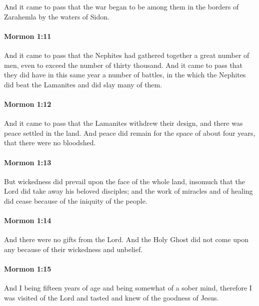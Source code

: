 			And it came to pass that the war began to be among them
			in the borders of Zarahemla by the waters of Sidon.

		\paragraph{Mormon 1:11} %
			\label{MORMON-1-11}

			And it came to pass that the Nephites had gathered together a great number of men,
			even to exceed the number of thirty thousand.
			And it came to pass that they did have in this same year a number of battles,
			in the which the Nephites did beat the Lamanites and did slay many of them.

		\paragraph{Mormon 1:12} %
			\label{MORMON-1-12}

			And it came to pass that the Lamanites withdrew their design,
			and there was peace settled in the land.
			And peace did remain for the space of about four years,
			that there were no bloodshed.

		\paragraph{Mormon 1:13} %
			\label{MORMON-1-13}

			But wickedness did prevail upon the face of the whole land,
			insomuch that the Lord did take away his beloved disciples;
			and the work of miracles and of healing did cease
			because of the iniquity of the people.

		\paragraph{Mormon 1:14} %
			\label{MORMON-1-14}

			And there were no gifts from the Lord.
			And the Holy Ghost did not come upon any
			because of their wickedness and unbelief.

		\paragraph{Mormon 1:15} %
			\label{MORMON-1-15}

			And I being fifteen years of age
			and being somewhat of a sober mind,
			therefore I was visited of the Lord
			and tasted and knew of the goodness of Jesus.

